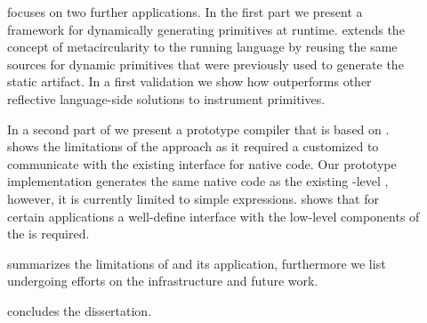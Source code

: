 \begin{description}
\item[] focuses on two further \B applications.
	In the first part we present \WF a framework for dynamically generating primitives at runtime.
	\WF extends the concept of metacircularity to the running language by reusing the same sources for dynamic primitives that were previously used to generate the static \VM artifact.
	In a first validation we show how \WF outperforms other reflective language-side solutions to instrument primitives.
	
	In a second part of  we present \NBJ a prototype \JIT compiler that is based on \B.
	\NBJ shows the limitations of the \B approach as it required a customized \VM to communicate with the existing \JIT interface for native code.
	Our prototype implementation generates the same native code as the existing \VM-level \JIT, however, it is currently limited to simple expressions.
	\NBJ shows that for certain applications a well-define interface with the low-level components of the \VM is required.

\item[] summarizes the limitations of \B and its application, furthermore we list undergoing efforts on the \B infrastructure and future work.

\item[] concludes the dissertation.

\end{description}



